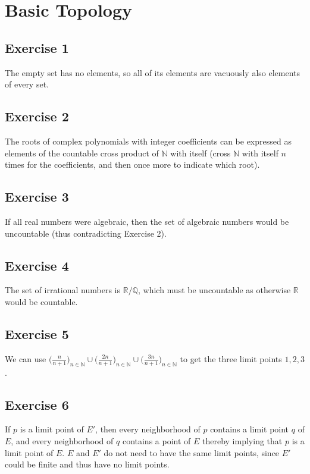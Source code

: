 \section{Basic Topology}

\subsection{Exercise 1}
The empty set has no elements, so all of its elements are vacuously also elements
of every set.

\subsection{Exercise 2}
The roots of complex polynomials with integer coefficients can be expressed 
as elements of the countable cross product of $\mathbb{N}$ with itself
(cross $\mathbb{N}$ with itself $n$ times for the coefficients, and then once
more to indicate which root).

\subsection{Exercise 3}
If all real numbers were algebraic, then the set of algebraic numbers would be
uncountable (thus contradicting Exercise 2).

\subsection{Exercise 4}
The set of irrational numbers is $\mathbb{R} / \mathbb{Q}$, which
must be uncountable as otherwise $\mathbb{R}$ would be countable.

\subsection{Exercise 5}
We can use $\big(\frac{n}{n+1}\big)_{n \in \mathbb{N}} \cup \big(\frac{2n}{n+1}\big)_{n \in \mathbb{N}} \cup \big(\frac{3n}{n+1}\big)_{n \in \mathbb{N}} $ to get the three limit points $1, 2, 3$.

\subsection{Exercise 6} 
If $p$ is a limit point of $E'$, then every neighborhood of $p$ contains
a limit point $q$ of $E$, and every neighborhood of $q$ contains a point
of $E$ thereby implying that $p$ is a limit point of $E$. $E$ and $E'$ 
do not need to have the same limit points, since $E'$ could be finite
and thus have no limit points.

